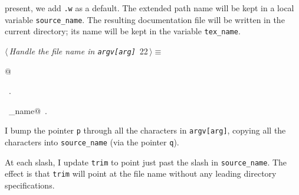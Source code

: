 \documentclass[a4paper]{report}
\begin{document}
present, we add \verb|.w| as a default. The extended path name will be
kept in a local variable \verb|source_name|. The resulting documentation
file will be written in the current directory; its name will be kept
in the variable \verb|tex_name|.
\begin{flushleft} \small
\begin{minipage}{\linewidth}\label{scrap32}\raggedright\small
{} $\langle\,${\it Handle the file name in \verb|argv[arg]|}\nobreak\ {\footnotesize {22}}$\,\rangle\equiv$
\vspace{-1ex}
\begin{list}{}{} \item
\mbox{}@{\NWsep}
\end{list}
\vspace{-1.5ex}
\footnotesize
\begin{list}{}{\setlength{\itemsep}{-\parsep}\setlength{\itemindent}{-\leftmargin}}
\item \NWtxtMacroRefIn\ .
\item \NWtxtIdentsUsed\nobreak\  \verb@source_name@\nobreak\ .
\item{}
\end{list}
\end{minipage}\vspace{4ex}
\end{flushleft}
I bump the pointer \verb|p| through all the characters in \verb|argv[arg]|,
copying all the characters into \verb|source_name| (via the pointer
\verb|q|).

At each slash, I update \verb|trim| to point just past the
slash in \verb|source_name|. The effect is that \verb|trim| will point
at the file name without any leading directory specifications.
\end{document}
